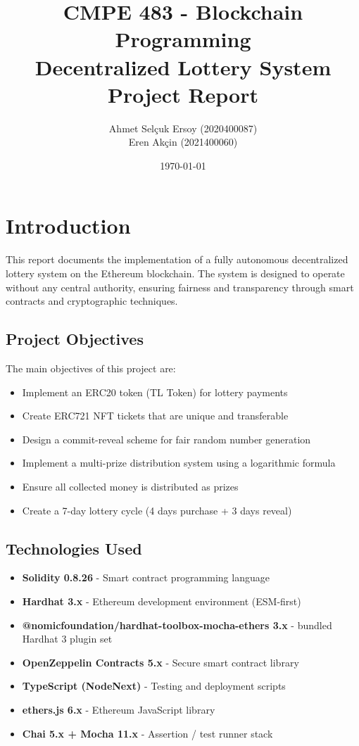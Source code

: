 \documentclass[12pt,a4paper]{article}
\title{
\textbf{CMPE 483 - Blockchain Programming} \\
\vspace{0.5cm}
\Large Decentralized Lottery System \\
\vspace{0.3cm}
\large Project Report
}
\author{Ahmet Selçuk Ersoy (2020400087) \\ Eren Akçin (2021400060)}
\date{\today}
\begin{document}
\maketitle
\thispagestyle{empty}
\newpage

\tableofcontents
\newpage

\section{Introduction}

This report documents the implementation of a fully autonomous decentralized lottery system on the Ethereum blockchain. The system is designed to operate without any central authority, ensuring fairness and transparency through smart contracts and cryptographic techniques.

\subsection{Project Objectives}

The main objectives of this project are:
\begin{itemize}
    \item Implement an ERC20 token (TL Token) for lottery payments
    \item Create ERC721 NFT tickets that are unique and transferable
    \item Design a commit-reveal scheme for fair random number generation
    \item Implement a multi-prize distribution system using a logarithmic formula
    \item Ensure all collected money is distributed as prizes
    \item Create a 7-day lottery cycle (4 days purchase + 3 days reveal)
\end{itemize}

\subsection{Technologies Used}

\begin{itemize}
    \item \textbf{Solidity 0.8.26} - Smart contract programming language
    \item \textbf{Hardhat 3.x} - Ethereum development environment (ESM-first)
    \item \textbf{@nomicfoundation/hardhat-toolbox-mocha-ethers 3.x} - bundled Hardhat 3 plugin set
    \item \textbf{OpenZeppelin Contracts 5.x} - Secure smart contract library
    \item \textbf{TypeScript (NodeNext)} - Testing and deployment scripts
    \item \textbf{ethers.js 6.x} - Ethereum JavaScript library
    \item \textbf{Chai 5.x + Mocha 11.x} - Assertion / test runner stack
\end{itemize}
\end{document}
